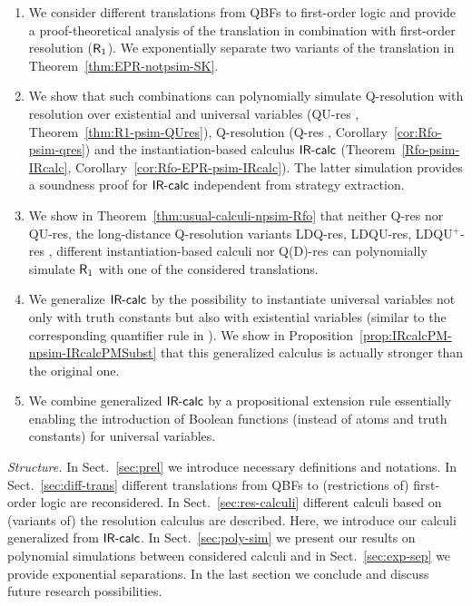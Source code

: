 \documentclass{llncs}
\newcommand{\qres}{\mbox{\sf Q-res}}
\newcommand{\qures}{\mbox{\sf QU-res}}
\newcommand{\qdres}{\mbox{\sf Q(D)-res}}
\newcommand{\ldqres}{\mbox{\sf LDQ-res}}
\newcommand{\ldqures}{\mbox{\sf LDQU-res}}
\newcommand{\ldqupres}{\mbox{\sf LDQU{}$^+$-res}}
\newcommand{\Rfo}{$\mbox{\sf R}_1$}
\newcommand{\IRcalc}{$\mbox{\sf IR-calc}$}
\begin{document}
\begin{enumerate}
\item We consider different translations from QBFs to first-order
  logic \cite{DBLP:conf/cade/SeidlLB12} and provide a
  proof-theoretical analysis of the translation in combination with
  first-order resolution (\Rfo). We exponentially separate two
  variants of the translation in Theorem~\ref{thm:EPR-notpsim-SK}.

\item We show that such combinations can polynomially simulate
  Q-resolution with resolution over existential and universal
  variables (\qures{} \cite{DBLP:conf/cp/Gelder12}, 
  Theorem~\ref{thm:R1-psim-QUres}), Q-resolution (\qres{}
  \cite{DBLP:journals/iandc/BuningKF95}, 
  Corollary~\ref{cor:Rfo-psim-qres}) and the instantiation-based
  calculus \IRcalc{} \cite{DBLP:conf/mfcs/BeyersdorffCJ14}
  (Theorem~\ref{Rfo-psim-IRcalc},
  Corollary~\ref{cor:Rfo-EPR-psim-IRcalc}). The latter simulation
  provides a soundness proof for \IRcalc{} independent from strategy
  extraction.

\item We show in Theorem~\ref{thm:usual-calculi-npsim-Rfo} that
  neither \qres{} nor \qures, the long-distance Q-resolution variants
  \ldqres, \ldqures, \ldqupres{}
  \cite{DBLP:conf/iccad/ZhangM02,DBLP:journals/fmsd/BalabanovJ12,BWJ:SAT14},
  different in\-stan\-tiation-based calculi
  \cite{DBLP:conf/mfcs/BeyersdorffCJ14} nor \qdres{}
  \cite{SlivovskySzeider-SAT14} can polynomially simulate \Rfo{} with
  one of the considered translations.

\item We generalize \IRcalc{} by the possibility to instantiate
  universal variables not only with truth constants but also with
  existential variables (similar to the corresponding quantifier rule
  in \cite{DBLP:conf/sat/Egly12}). We show in
  Proposition~\ref{prop:IRcalcPM-npsim-IRcalcPMSubst} that this
  generalized calculus is actually stronger than the original one.

\item We combine generalized \IRcalc{} by a propositional extension
  rule \cite{Tseitin:1968,BCJ-AAAI-WS16}
  essentially enabling the introduction of Boolean functions (instead
  of atoms and truth constants) for universal variables.

\end{enumerate}


\noindent
\emph{Structure.}  In Sect.~\ref{sec:prel} we introduce necessary
definitions and notations. In Sect.~\ref{sec:diff-trans} different
translations from QBFs to (restrictions of) first-order logic
\cite{DBLP:conf/cade/SeidlLB12} are reconsidered. In
Sect.~\ref{sec:res-calculi} different calculi based on (variants of)
the resolution calculus are described. Here, we introduce our calculi
generalized from \IRcalc. In Sect.~\ref{sec:poly-sim} we present our
results on polynomial simulations between considered calculi and in
Sect.~\ref{sec:exp-sep} we provide exponential separations. In the
last section we conclude and discuss future research possibilities.
\end{document}
